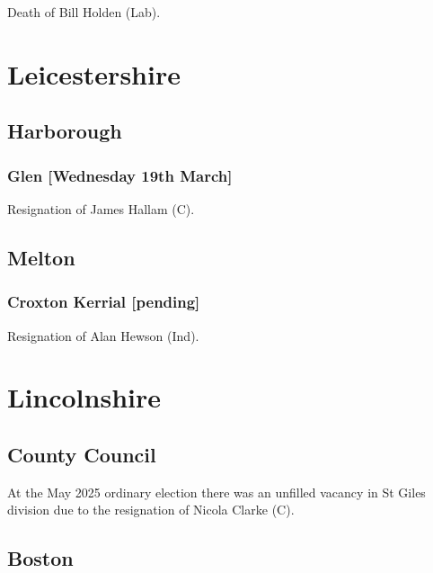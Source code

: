 \documentclass[a4paper,openany]{book}
\begin{document}
\begin{resultsiii}
Death of Bill Holden (Lab).

\section{Leicestershire}

\subsection*{Harborough}

\subsubsection*{Glen \hspace*{\fill}\nolinebreak[1]%
	\enspace\hspace*{\fill}
	[Wednesday 19th March]}


Resignation of James Hallam (C).

\subsection*{Melton}

\subsubsection*{Croxton Kerrial \hspace*{\fill}\nolinebreak[1]%
	\enspace\hspace*{\fill}
	[pending]}


Resignation of Alan Hewson (Ind).

\section{Lincolnshire}

\subsection*{County Council}

At the May 2025 ordinary election there was an unfilled vacancy in St Giles division due to the resignation of Nicola Clarke (C).%

\subsection*{Boston}


\end{resultsiii}
\end{document}
